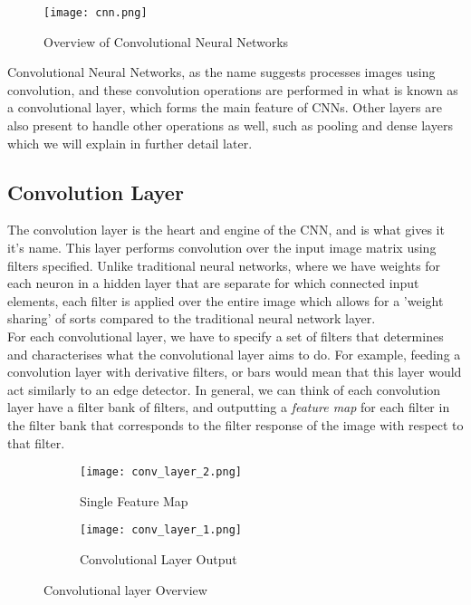 \documentclass[12pt]{article}
\begin{document}
\begin{figure}[!htb]
\centering
  \texttt{[image: cnn.png]}
  \caption{Overview of Convolutional Neural Networks}
  \label{fig:cnn}
\end{figure}

Convolutional Neural Networks, as the name suggests processes images using convolution, and these convolution operations are performed in what is known as a convolutional layer, which forms the main feature of CNNs. Other layers are also present to handle other operations as well, such as pooling and dense layers which we will explain in further detail later. 

\subsection{Convolution Layer}

The convolution layer is the heart and engine of the CNN, and is what gives it it's name. This layer performs convolution over the input image matrix using filters specified. Unlike traditional neural networks, where we have weights for each neuron in a hidden layer that are separate for which connected input elements, each filter is applied over the entire image which allows for a 'weight sharing' of sorts compared to the traditional neural network layer. \\

For each convolutional layer, we have to specify a set of filters that determines and characterises what the convolutional layer aims to do. For example, feeding a convolution layer with derivative filters, or bars would mean that this layer would act similarly to an edge detector. In general, we can think of each convolution layer have a filter bank of filters, and outputting a \textit{feature map} for each filter in the filter bank that corresponds to the filter response of the image with respect to that filter.

\begin{figure}
\centering
\begin{subfigure}{.5\textwidth}
  \centering
  \texttt{[image: conv\_layer\_2.png]}
  \caption{Single Feature Map}
  \label{fig:sub1}
\end{subfigure}%
\begin{subfigure}{.5\textwidth}
  \centering
  \texttt{[image: conv\_layer\_1.png]}
  \caption{Convolutional Layer Output}
  \label{fig:sub2}
\end{subfigure}
\caption{Convolutional layer Overview}
\label{fig:test}
\end{figure}
\end{document}
